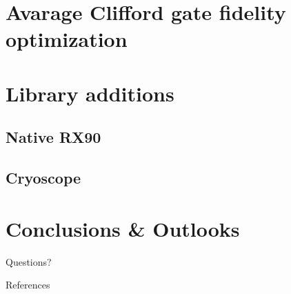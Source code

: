 \documentclass[aspectratio=169,10pt]{beamer}
\begin{document}
\section{Avarage Clifford gate fidelity optimization}

%
%
%  

\section{Library additions}

\subsection{Native RX90}

%  

\subsection{Cryoscope}

%  
%
%  
%
%  

\section{Conclusions \& Outlooks}


\begin{frame}[t,standout]
\Large
Questions?
\end{frame}


\begin{frame}{References}
    \nocite{*}
    
    
\end{frame}
\end{document}
